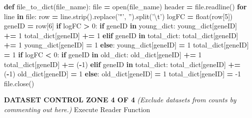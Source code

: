 \documentclass[
]{article}
\newenvironment{Shaded}{\begin{snugshade}}{\end{snugshade}}
\newcommand{\BuiltInTok}[1]{#1}
\newcommand{\CharTok}[1]{\textcolor[rgb]{0.31,0.60,0.02}{#1}}
\newcommand{\ControlFlowTok}[1]{\textcolor[rgb]{0.13,0.29,0.53}{\textbf{#1}}}
\newcommand{\DecValTok}[1]{\textcolor[rgb]{0.00,0.00,0.81}{#1}}
\newcommand{\KeywordTok}[1]{\textcolor[rgb]{0.13,0.29,0.53}{\textbf{#1}}}
\newcommand{\NormalTok}[1]{#1}
\newcommand{\OperatorTok}[1]{\textcolor[rgb]{0.81,0.36,0.00}{\textbf{#1}}}
\newcommand{\StringTok}[1]{\textcolor[rgb]{0.31,0.60,0.02}{#1}}
\begin{document}
\begin{Shaded}
\begin{Highlighting}[]
\KeywordTok{def}\NormalTok{ file_to_dict(file_name):}
    \BuiltInTok{file} \OperatorTok{=} \BuiltInTok{open}\NormalTok{(file_name)}
\NormalTok{    header }\OperatorTok{=} \BuiltInTok{file}\NormalTok{.readline()}
    \ControlFlowTok{for}\NormalTok{ line }\KeywordTok{in} \BuiltInTok{file}\NormalTok{:}
\NormalTok{      row }\OperatorTok{=}\NormalTok{ line.strip().replace(}\StringTok{'"'}\NormalTok{, }\StringTok{''}\NormalTok{).split(}\StringTok{'}\CharTok{\textbackslash{}t}\StringTok{'}\NormalTok{)}
\NormalTok{      logFC }\OperatorTok{=} \BuiltInTok{float}\NormalTok{(row[}\DecValTok{5}\NormalTok{])}
\NormalTok{      geneID }\OperatorTok{=}\NormalTok{ row[}\DecValTok{6}\NormalTok{]}
      \ControlFlowTok{if}\NormalTok{ logFC }\OperatorTok{>} \DecValTok{0}\NormalTok{:}
        \ControlFlowTok{if}\NormalTok{ geneID }\KeywordTok{in}\NormalTok{ young_dict:}
\NormalTok{          young_dict[geneID] }\OperatorTok{+=} \DecValTok{1}
\NormalTok{          total_dict[geneID] }\OperatorTok{+=} \DecValTok{1}
        \ControlFlowTok{elif}\NormalTok{ geneID }\KeywordTok{in}\NormalTok{ total_dict:}
\NormalTok{          total_dict[geneID] }\OperatorTok{+=} \DecValTok{1}
\NormalTok{          young_dict[geneID] }\OperatorTok{=} \DecValTok{1}
        \ControlFlowTok{else}\NormalTok{:}
\NormalTok{          young_dict[geneID] }\OperatorTok{=} \DecValTok{1}
\NormalTok{          total_dict[geneID] }\OperatorTok{=} \DecValTok{1}
      \ControlFlowTok{if}\NormalTok{ logFC }\OperatorTok{<} \DecValTok{0}\NormalTok{:}
        \ControlFlowTok{if}\NormalTok{ geneID }\KeywordTok{in}\NormalTok{ old_dict:}
\NormalTok{          old_dict[geneID] }\OperatorTok{+=} \DecValTok{1}
\NormalTok{          total_dict[geneID] }\OperatorTok{+=}\NormalTok{ (}\OperatorTok{-}\DecValTok{1}\NormalTok{)}
        \ControlFlowTok{elif}\NormalTok{ geneID }\KeywordTok{in}\NormalTok{ total_dict:}
\NormalTok{          total_dict[geneID] }\OperatorTok{+=}\NormalTok{ (}\OperatorTok{-}\DecValTok{1}\NormalTok{)}
\NormalTok{          old_dict[geneID] }\OperatorTok{=} \DecValTok{1}
        \ControlFlowTok{else}\NormalTok{:}
\NormalTok{          old_dict[geneID] }\OperatorTok{=} \DecValTok{1}
\NormalTok{          total_dict[geneID] }\OperatorTok{=} \DecValTok{-1}
    \BuiltInTok{file}\NormalTok{.close()}
\end{Highlighting}
\end{Shaded}

\textbf{DATASET CONTROL ZONE 4 OF 4} \emph{(Exclude datasets from counts
by commenting out here.)} Execute Reader Function
\end{document}
